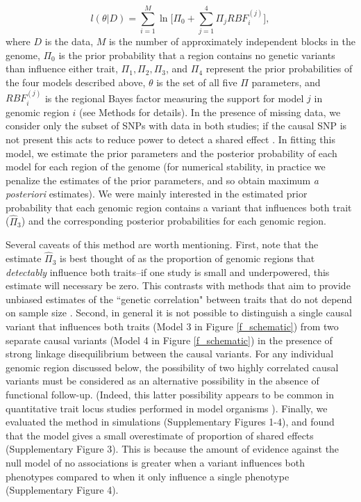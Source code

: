\documentclass[11pt,titlepage]{article}
\begin{document}
\begin{equation}
l(\theta | D) = \sum \limits_{i = 1}^M \ln \bigg[ \Pi_0 + \sum \limits_{j = 1}^4 \Pi_j RBF_i^{(j)} \bigg],
\end{equation}
\noindent where $D$ is the data, $M$ is the number of approximately independent blocks in the genome, $\Pi_0$ is the prior probability that a region contains no genetic variants than influence either trait, $\Pi_1, \Pi_2, \Pi_3$, and $\Pi_4$ represent the prior probabilities of the four models described above, $\theta$ is the set of all five $\Pi$ parameters, and $RBF_i^{(j)}$ is the regional Bayes factor measuring the support for model $j$ in genomic region $i$ (see Methods for details). 
In the presence of missing data, we consider only the subset of SNPs with data in both studies; if the causal SNP is not present this acts to reduce power to detect a shared effect \citep{Giambartolomei:2014aa}. 
In fitting this model, we estimate the prior parameters and the posterior probability of each model for each region of the genome (for numerical stability, in practice we penalize the estimates of the prior parameters, and so obtain maximum \emph{a posteriori} estimates). 
We were mainly interested in the estimated prior probability that each genomic region contains a variant that influences both trait ($\hat \Pi_3$) and the corresponding posterior probabilities for each genomic region.

Several caveats of this method are worth mentioning. 
First, note that the estimate $\hat \Pi_3$ is best thought of as the proportion of genomic regions that \emph{detectably} influence both traits--if one study is small and underpowered, this estimate will necessary be zero. 
This contrasts with methods that aim to provide unbiased estimates of the ``genetic correlation" between traits that do not depend on sample size \citep{bulik2015atlas, Yang:2011aa, Loh:2015aa}.
Second, in general it is not possible to distinguish a single causal variant that influences both traits (Model 3 in Figure \ref{f_schematic}) from two separate causal variants (Model 4 in Figure \ref{f_schematic}) in the presence of strong linkage disequilibrium between the causal variants. 
For any individual genomic region discussed below, the possibility of two highly correlated causal variants must be considered as an alternative possibility in the absence of functional follow-up. 
(Indeed, this latter possibility appears to be common in quantitative trait locus studies performed in model organisms \citep{Flint:2009aa}). 
Finally, we evaluated the method in simulations (Supplementary Figures 1-4), and found that the model gives a small overestimate of proportion of shared effects (Supplementary Figure 3). 
This is because the amount of evidence against the null model of no associations is greater when a variant influences both phenotypes compared to when it only influence a single phenotype (Supplementary Figure 4). 
\end{document}
